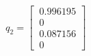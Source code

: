 \documentclass[preview]{standalone}
\begin{document}
\begin{center}
$q_2 = \begin{bmatrix}\
                    0.996195 \\\
                    0 \\\
                    0.087156 \\\
                    0\
                \end{bmatrix}$
\end{center}
\end{document}
